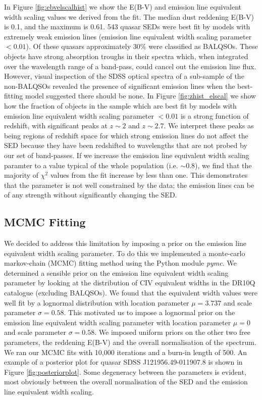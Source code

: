 In Figure \ref{fig:ebvelscalhist} we show the E(B-V) and emission line equivalent width scaling values we derived from the fit. 
The median dust reddening E(B-V) is 0.1, and the maximum is 0.61. 
543 quasar SEDs were best fit by models with extremely weak emission lines (emission line equivalent width scaling parameter $< 0.01$). 
Of these quasars approximately 30\% were classified as BALQSOs. 
These objects have strong absorption troughs in their spectra which, when integrated over the wavelength range of a band-pass, could cancel out the emission line flux. 
However, visual inspection of the SDSS optical spectra of a sub-sample of the non-BALQSOs revealed the presence of significant emission lines when the best-fitting model suggested there should be none. 
In Figure \ref{fig:zhist_elscal} we show how the fraction of objects in the sample which are best fit by models with emission line equivalent width scaling parameter $< 0.01$ is a strong function of redshift, with significant peaks at $z \sim 2$ and $z \sim 2.7$. 
We interpret these peaks as being regions of redshift space for which strong emission lines do not affect the SED because they have been redshifted to wavelengths that are not probed by our set of band-passes. 
If we increase the emission line equivalent width scaling paramter to a value typical of the whole population (i.e. $\sim 0.8$), we find that the majority of $\chi^2$ values from the fit increase by less than one. 
This demonstrates that the parameter is not well constrained by the data; the emission lines can be of any strength without significantly changing the SED.   

\subsection{MCMC Fitting}

We decided to address this limitation by imposing a prior on the emission line equivalent width scaling parameter. To do this we implemented a monte-carlo markov-chain (MCMC) fitting method using the Python module {\it pymc}. 
We determined a sensible prior on the emission line equivalent width scaling parameter by looking at the distribution of CIV equivalent widths in the DR10Q catalogue (excluding BALQSOs). 
We found that the equivalent width values were well fit by a lognormal distribution with location parameter $\mu = 3.737$ and scale parameter $\sigma = 0.58$. 
This motivated us to impose a lognormal prior on the emission line equivalent width scaling parameter with location parameter $\mu = 0$ and scale parameter $\sigma = 0.58$. 
We imposed uniform priors on the other two free parameters, the reddening E(B-V) and the overall normalisation of the spectrum. 
We ran our MCMC fits with 10,000 iterations and a burn-in length of 500. 
An example of a posterior plot for quasar SDSS J121956.49-011907.8 is shown in Figure \ref{fig:posteriorplot}. Some degeneracy between the parameters is evident, most obviously between the overall normalisation of the SED and the emission line equivalent width scaling. 


